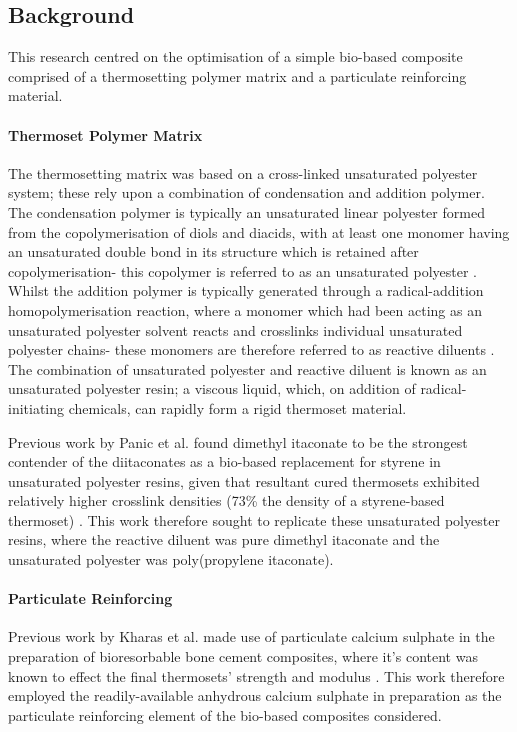 \subsection{Background}
This research centred on the optimisation of a simple bio-based composite
 comprised of a thermosetting polymer matrix and a particulate reinforcing
 material.

\paragraph{Thermoset Polymer Matrix}
The thermosetting matrix was based on a cross-linked unsaturated polyester
 system; these rely upon a combination of condensation and addition polymer.
The condensation polymer is typically an unsaturated linear polyester
 formed from the copolymerisation of diols and diacids, with at least one
 monomer having an unsaturated double bond in its structure which is
 retained after copolymerisation- this copolymer is referred to as an
 unsaturated polyester \autocite{Seraji2022}.
Whilst the addition polymer is typically generated through a radical-addition
 homopolymerisation reaction, where a monomer which had been acting as
 an unsaturated polyester solvent reacts and crosslinks individual 
 unsaturated polyester chains- these monomers are therefore referred to as
 reactive diluents \autocite{Chen2015}.
The combination of unsaturated polyester and reactive diluent is known
 as an unsaturated polyester resin; a viscous liquid, which, on addition
 of radical-initiating chemicals, can rapidly form a rigid thermoset
 material.

Previous work by Panic et al. found dimethyl itaconate to be the strongest
 contender of the diitaconates as a bio-based replacement for styrene
 in unsaturated polyester resins, given that resultant cured thermosets
 exhibited relatively higher crosslink densities (73\unit{\percent} the
 density of a styrene-based thermoset) \autocite{Panic2017}.
This work therefore sought to replicate these unsaturated polyester resins,
 where the reactive diluent was pure dimethyl itaconate and the unsaturated
 polyester was poly(propylene itaconate).

\paragraph{Particulate Reinforcing}
Previous work by Kharas et al. made use of particulate calcium sulphate
 in the preparation of bioresorbable bone cement composites, where it's 
 content was known to effect the final thermosets' strength and modulus
 \autocite{Kharas1997}.
This work therefore employed the readily-available anhydrous
 calcium sulphate in preparation as the particulate reinforcing element
 of the bio-based composites considered.

